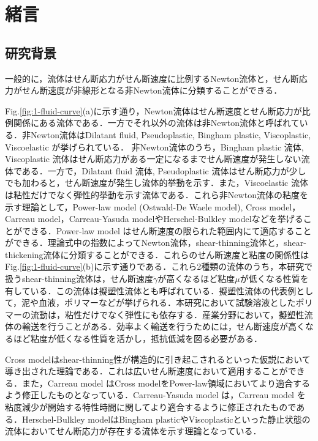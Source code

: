 \section{緒言}

\subsection{研究背景}

一般的に，流体はせん断応力がせん断速度に比例するNewton流体と，せん断応力がせん断速度が非線形となる非Newton流体に分類することができる．

Fig.\ref{fig:1-fluid-curve}(a)に示す通り，Newton流体はせん断速度とせん断応力が比例関係にある流体である．一方でそれ以外の流体は非Newton流体と呼ばれている．非Newton流体はDilatant fluid, Pseudoplastic, Bingham plastic, Viscoplastic, Viscoelastic が挙げられている．
非Newton流体のうち，Bingham plastic 流体, Viscoplastic 流体はせん断応力がある一定になるまでせん断速度が発生しない流体である．一方で，Dilatant fluid 流体, Pseudoplastic 流体はせん断応力が少しでも加わると，せん断速度が発生し流体的挙動を示す．また，Viscoelastic 流体は粘性だけでなく弾性的挙動を示す流体である．これら非Newton流体の粘度を示す理論として，Power-law model (Ostwald-De Waele model), Cross model，Carreau model，Carreau-Yasuda modelやHerschel-Bulkley modelなどを挙げることができる\cite{ref:1}．Power-law model はせん断速度の限られた範囲内にて適応することができる．理論式中の指数によってNewton流体，shear-thinning流体と，shear-thickening流体に分類することができる．これらのせん断速度と粘度の関係性はFig.\ref{fig:1-fluid-curve}(b)に示す通りである．これら2種類の流体のうち，本研究で扱うshear-thinning流体は，せん断速度$\dot{\gamma}$が高くなるほど粘度$\mu$が低くなる性質を有している．この流体は擬塑性流体とも呼ばれている．擬塑性流体の代表例として，泥や血液，ポリマーなどが挙げられる．本研究において試験溶液としたポリマーの流動は，粘性だけでなく弾性にも依存する\cite{viscoelasticity}．産業分野において，擬塑性流体の輸送を行うことがある．効率よく輸送を行うためには，せん断速度が高くなるほど粘度が低くなる性質を活かし，抵抗低減を図る必要がある．

Cross modelはshear-thinning性が構造的に引き起こされるといった仮説において導き出された理論である．これは広いせん断速度において適用することができる．また，Carreau model はCross modelをPower-law領域においてより適合するよう修正したものとなっている．Carreau-Yasuda model は，Carreau model を粘度減少が開始する特性時間に関してより適合するように修正されたものである．Herschel-Bulkley modelはBingham plasticやViscoplasticといった静止状態の流体においてせん断応力が存在する流体を示す理論となっている\cite{ref:1}．

